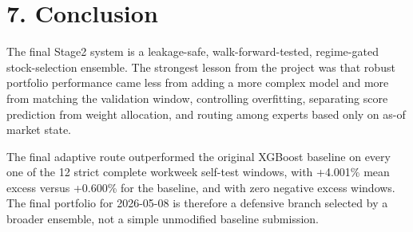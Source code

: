 \documentclass[11pt]{article}
\begin{document}
\section{7. Conclusion}\label{conclusion}

The final Stage2 system is a leakage-safe, walk-forward-tested,
regime-gated stock-selection ensemble. The strongest lesson from the
project was that robust portfolio performance came less from adding a
more complex model and more from matching the validation window,
controlling overfitting, separating score prediction from weight
allocation, and routing among experts based only on as-of market state.

The final adaptive route outperformed the original XGBoost baseline on
every one of the 12 strict complete workweek self-test windows, with
+4.001\% mean excess versus +0.600\% for the baseline, and with zero
negative excess windows. The final portfolio for 2026-05-08 is therefore
a defensive branch selected by a broader ensemble, not a simple
unmodified baseline submission.
\end{document}
